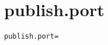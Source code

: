 \section{publish.port}
\label{configuration:PublishPort}
\ClearAPI
\TODO
\begin{lstlisting}[style=Props,caption={Usage example for \textit{publish.port}}]
publish.port=
\end{lstlisting}